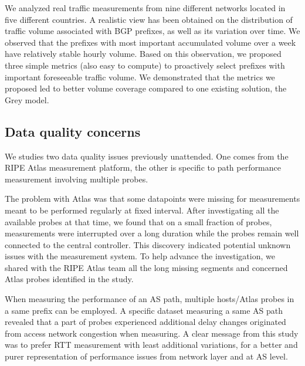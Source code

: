 We analyzed real traffic measurements from nine different networks located in five different countries.
A realistic view has been obtained on the distribution of traffic volume associated with BGP prefixes, as well as its variation over time.   
We observed that the prefixes with most important accumulated volume over a week have relatively stable hourly volume. 
Based on this observation, we proposed three simple 
metrics (also easy to compute) to proactively select prefixes with important foreseeable traffic volume.
We demonstrated that the metrics we proposed led to better volume coverage compared to one existing solution, the Grey model.

\subsection{Data quality concerns}
We studies two data quality issues previously unattended. One comes from the RIPE Atlas measurement platform, the other is specific to path performance measurement involving multiple probes.

The problem with Atlas was that some datapoints were missing for measurements meant to be performed regularly at fixed interval.
After investigating all the available probes at that time, we found that on a small fraction of probes, measurements were interrupted over a long duration while the probes remain well connected to the central controller.
This discovery indicated potential unknown issues with the measurement system.
To help advance the investigation, we shared with the RIPE Atlas team all the long missing segments and concerned Atlas probes identified in the study.

When measuring the performance of an AS path, multiple hosts/Atlas probes in a same prefix can be employed. A specific dataset measuring a same AS path revealed that a part of probes experienced additional delay changes originated from access network congestion when measuring. A clear message from this study was to prefer RTT measurement with least additional variations, for a better and purer representation of performance issues from network layer and at AS level.

